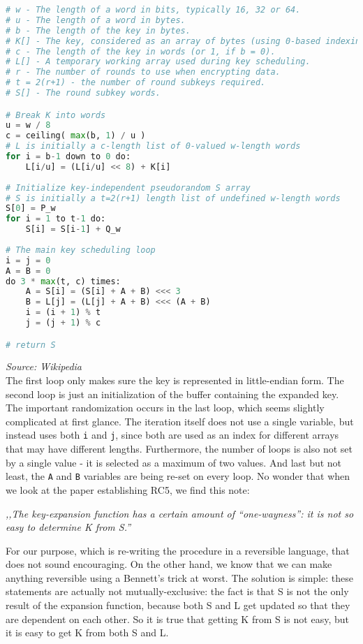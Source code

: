 \documentclass[a4paper,10pt,openright]{memoir}
\newcommand{\code}[1]{\texttt{#1}}
\begin{document}
\begin{lstlisting}[language=Python]
# w - The length of a word in bits, typically 16, 32 or 64.
# u - The length of a word in bytes.
# b - The length of the key in bytes.
# K[] - The key, considered as an array of bytes (using 0-based indexing).
# c - The length of the key in words (or 1, if b = 0).
# L[] - A temporary working array used during key scheduling.
# r - The number of rounds to use when encrypting data.
# t = 2(r+1) - the number of round subkeys required.
# S[] - The round subkey words.

# Break K into words
u = w / 8
c = ceiling( max(b, 1) / u )
# L is initially a c-length list of 0-valued w-length words
for i = b-1 down to 0 do:
    L[i/u] = (L[i/u] << 8) + K[i]
     
# Initialize key-independent pseudorandom S array
# S is initially a t=2(r+1) length list of undefined w-length words
S[0] = P_w
for i = 1 to t-1 do:
    S[i] = S[i-1] + Q_w
    
# The main key scheduling loop
i = j = 0
A = B = 0
do 3 * max(t, c) times:
    A = S[i] = (S[i] + A + B) <<< 3
    B = L[j] = (L[j] + A + B) <<< (A + B)
    i = (i + 1) % t
    j = (j + 1) % c

# return S
\end{lstlisting}
\textit{\footnotesize Source: Wikipedia}\\

The first loop only makes sure the key is represented in little-endian 
form. The second loop is just an initialization of the buffer 
containing the expanded key. The important randomization occurs in the 
last loop, which seems slightly complicated at first glance. The 
iteration itself does not use a single variable, but instead uses both 
\code{i} and \code{j}, since both are used as an index for different 
arrays that may have different lengths. Furthermore, the number of 
loops is also not set by a single value - it is selected as a maximum 
of two values. And last but not least, the \code{A} and \code{B} 
variables are being re-set on every loop. No wonder that when we look 
at the paper establishing RC5, we find this note: 

\textit{,,The key-expansion function has a certain amount of 
``one-wayness'': it is not so easy to determine K from S.''}

For our purpose, which is re-writing the procedure in a reversible 
language, that does not sound encouraging. On the other hand, we know that 
we can make anything reversible using a Bennett's trick at worst. The 
solution is simple: these statements are actually not 
mutually-exclusive: the fact is that S is not the only result of the 
expansion function, because both S and L get updated so that they are 
dependent on each other. So it is true that getting K from S is not 
easy, but it is easy to get K from both S and L.
\end{document}

